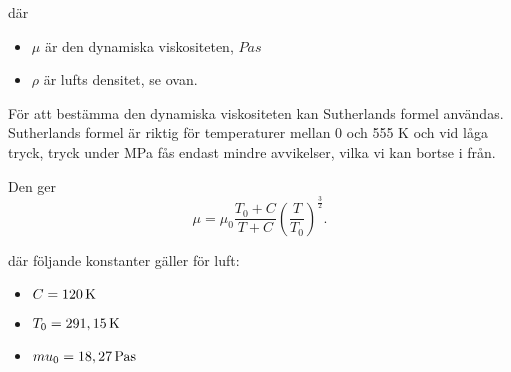 där 
\begin{itemize}
\item[] $\mu$ är den dynamiska viskositeten, $\unit{Pa s}$
\item[] $\rho$ är lufts densitet, se ovan.\\
\end{itemize}

För att bestämma den dynamiska viskositeten kan Sutherlands formel användas. Sutherlands formel är riktig för temperaturer mellan 0 och 555 K och vid låga tryck, tryck under \unit[3,45]{MPa} fås endast mindre avvikelser, vilka vi kan bortse i från.\cite{sutherlandsformula}

Den ger  
\begin{equation}
{\mu} = {\mu}_0 \frac {T_0+C} {T + C} \left (\frac {T} {T_0} \right )^{\frac{3}{2}}.
\end{equation}

där följande konstanter gäller för luft:
\begin{itemize}
\item[] $C=\unit[120]{K}$
\item[] $T_0=\unit[291,15]{K}$
\item[] $mu_0=\unit[18,27]{Pa s}$
\end{itemize}



